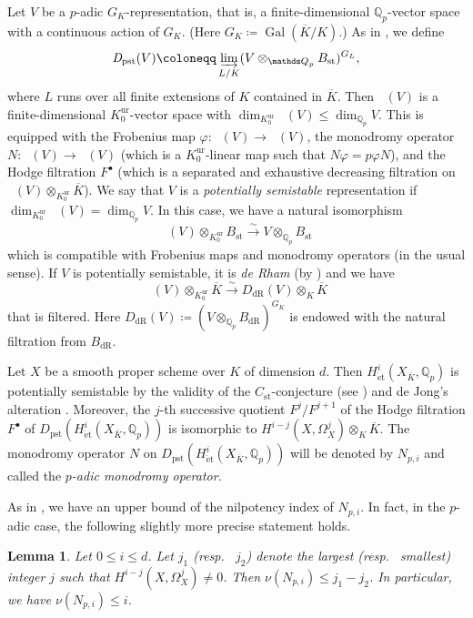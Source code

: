\documentclass[12pt,reqno]{amsart}
\newtheorem{lem}[thm]{Lemma}
\theoremstyle{definition}
\newcommand{\Q}{{\mathds Q}}
\DeclareMathOperator{\Dpst}{\mathit{D}_{\mathrm{pst}}}
\newcommand\Gal{\mathop{\mathrm{Gal}}\nolimits}
\newcommand\dR{\mathop{\mathrm{dR}}}
\newcommand{\et}{\mathrm{\acute{e}t}}
\DeclareMathOperator{\pst}{pst}
\DeclareMathOperator{\st}{st}
\DeclareMathOperator{\ur}{ur}
\numberwithin{equation}{section}
\begin{document}
Let $V$ be a $p$-adic $G_K$-representation, that is, a finite-dimensional $\Q_p$-vector space with a continuous action of $G_K$.
(Here $G_K\coloneqq\Gal(\overline{K}/K)$.)
As in \cite{Fontaine94III},
we define
\[
    \Dpst(V) \coloneqq \varinjlim_{L/K}(V \otimes_{\Q_p} B_{\st})^{G_L},
\]
where $L$ runs over all finite extensions of $K$ contained in $\overline{K}$.
Then
$\Dpst(V)$ is a finite-dimensional $K_0^{\ur}$-vector space
with $\dim_{K_0^{\ur}} \Dpst(V) \leq \dim_{\Q_p} V$.
This is equipped with
the Frobenius map
$\varphi \colon \Dpst(V) \to \Dpst(V)$,
the monodromy operator
$N \colon \Dpst(V) \to \Dpst(V)$ (which is a $K_0^{\ur}$-linear map such that $N \varphi = p \varphi N$), and the Hodge filtration
$F^{\bullet}$
(which is a separated and exhaustive decreasing filtration on $\Dpst(V) \otimes_{K_0^{\ur}} \overline{K}$).
We say that $V$ is a \emph{potentially semistable} representation if $\dim_{K_0^{\ur}} \Dpst(V) = \dim_{\Q_p} V$.
In this case, we have a natural isomorphism
\[
\Dpst(V) \otimes_{K_0^{\ur}} B_{\st} \overset{\sim}{\to} V \otimes_{\Q_p} B_{\st}
\]
which is compatible with Frobenius maps and monodromy operators (in the usual sense).
If $V$ is potentially semistable, it is \emph{de Rham}  (by \cite[Th\'eor\`eme in \S 5.6.7]{Fontaine94III})
and we have 
\[
\Dpst(V) \otimes_{K_0^{\ur}} \overline{K} \overset{\sim}{\to} D_{\dR}(V) \otimes_K \overline{K}
\]
that is filtered.
Here $D_{\dR}(V)\coloneqq (V \otimes_{\Q_p} B_{\dR})^{G_K}$ is endowed with the natural filtration from $B_{\dR}$.


Let $X$ be a smooth proper scheme over $K$ of dimension $d$.
Then $H_{\et}^{i}(X_{\overline{K}},\Q_{p})$ is potentially semistable by the validity of the $C_{\st}$-conjecture (see \cite[Theorem 0.2]{Tsuji}) and de Jong's alteration \cite[Theorem 6.5]{deJong96}.
Moreover, the $j$-th successive quotient $F^{j}/F^{j+1}$
of the Hodge filtration $F^\bullet$ of $D_{\pst}(H_{\et}^{i}(X_{\overline{K}},\Q_{p}))$ is isomorphic to $H^{i-j}(X, \Omega^j_X) \otimes_K \overline{K}$.
The monodromy operator $N$ on $D_{\pst}(H_{\et}^{i}(X_{\overline{K}},\Q_{p}))$
will be denoted by $N_{p,i}$ and called the \textit{$p$-adic monodromy operator}.


As in , we have an upper bound of the nilpotency index of $N_{p,i}$.
In fact, in the $p$-adic case, the following slightly more precise statement holds.

\begin{lem}\label{Lemma:p adic nilpotency index upper bound in general}
    Let $0 \leq i \leq d$.
    Let $j_1$ (resp.~ $j_2$) denote the largest (resp.~ smallest) integer $j$
    such that 
    $H^{i-j}(X, \Omega^{j}_X) \neq 0$.
    Then $\nu(N_{p,i}) \leq j_1 - j_2$.
    In particular, we have $\nu(N_{p,i}) \leq i$.
\end{lem}
\end{document}
